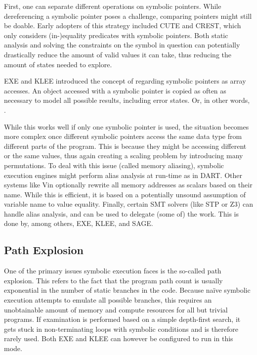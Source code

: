 \documentclass{article}
\begin{document}
\begin{multicols}{2}
    First, one can separate different operations on symbolic pointers. While dereferencing a symbolic pointer poses a challenge, comparing pointers might still be doable. Early adopters of this strategy included CUTE\cite{CUTE} and CREST\cite{CREST}, which only considers (in-)equality predicates with symbolic pointers. Both static analysis and solving the constraints on the symbol in question can potentially drastically reduce the amount of valid values it can take, thus reducing the amount of states needed to explore.

    EXE\cite{EXE} and KLEE\cite{KLEE} introduced the concept of regarding symbolic pointers as array accesses. An object accessed with a symbolic pointer is copied as often as necessary to model all possible results, including error states. Or, in other words, \cite{AllYouEverWanted}.

    While this works well if only one symbolic pointer is used, the situation becomes more complex once different symbolic pointers access the same data type from different parts of the program. This is because they might be accessing different or the same values, thus again creating a scaling problem by introducing many permutations. To deal with this issue (called memory aliasing), symbolic execution engines might perform alias analysis at run-time as in DART\cite{DART}. Other systems like Vin\cite{BitBlaze} optionally rewrite all memory addresses as scalars based on their name. While this is efficient, it is based on a potentially unsound assumption of variable name to value equality. Finally, certain SMT solvers (like STP\cite{STP} or Z3\cite{Z3}) can handle alias analysis, and can be used to delegate (some of) the work. This is done by, among others, EXE\cite{EXE}, KLEE\cite{KLEE}, and SAGE\cite{SAGE}.

    \subsection{Path Explosion}
    One of the primary issues symbolic execution faces is the so-called path explosion. This refers to the fact that the program path count is usually exponential in the number of static branches in the code. Because naïve symbolic execution attempts to emulate all possible branches, this requires an unobtainable amount of memory and compute resources for all but trivial programs. If examination is performed based on a simple depth-first search, it gets stuck in non-terminating loops with symbolic conditions and is therefore rarely used. Both EXE\cite{EXE} and KLEE\cite{KLEE} can however be configured to run in this mode.


\end{multicols}
\end{document}
